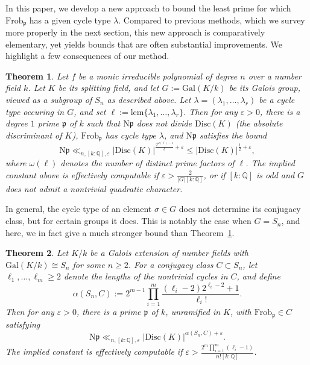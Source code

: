 \documentclass[12pt]{amsart}
\newtheorem{theorem}{Theorem}
\theoremstyle{definition} \newtheorem{definition}[theorem]{Definition}
\theoremstyle{example} \newtheorem{example}[theorem]{Example}
\theoremstyle{remark} \newtheorem{remark}{Remark}[theorem]
\numberwithin{equation}{section}
\numberwithin{theorem}{section}
\renewcommand{\epsilon}{\varepsilon}
\renewcommand{\leq}{\leqslant}
\renewcommand{\geq}{\geqslant}
\newcommand{\N}{\mathrm{N}} %
\begin{document}
	In this paper, we develop a new approach to bound the least prime for which $\mathrm{Frob}_\mathfrak{p}$ has a given cycle type $\lambda$.  Compared to previous methods, which we survey more properly in the next section, this new approach is comparatively elementary, yet yields bounds that are often substantial improvements.  We highlight a few consequences of our method.
	
	
	\begin{theorem}\label{thm:least-prime-general}
		Let $f$ be a monic irreducible polynomial of degree $n$ over a number field $k$. Let $K$ be its splitting field, and let $G := \mathrm{Gal}(K/k)$ be its Galois group, viewed as a subgroup of $S_n$ as described above.  Let $\lambda = (\lambda_1,\dots,\lambda_r)$ be a cycle type occuring in $G$, and set $\ell := \mathrm{lcm}\{\lambda_1,\dots,\lambda_r\}$.  Then for any $\epsilon>0$, there is a degree $1$ prime $\mathfrak{p}$ of $k$ such that $\N\mathfrak{p}$ does not divide $\mathrm{Disc}(K)$ (the absolute discriminant of $K$),  $\mathrm{Frob}_\mathfrak{p}$ has cycle type $\lambda$, and $\N\mathfrak{p}$ satisfies the bound
			\[
				\N\mathfrak{p}
					\ll_{n,[k:\mathbb{Q}],\epsilon} |\mathrm{Disc}(K)|^{\frac{2^{\omega(\ell)-1}}{\ell} + \epsilon}
					\leq |\mathrm{Disc}(K)|^{\frac{1}{2} + \epsilon},
			\]
		where $\omega(\ell)$ denotes the number of distinct prime factors of $\ell$.  The implied constant above is effectively computable if $\epsilon > \frac{2}{|G|[k:\mathbb{Q}]}$, or if $[k:\mathbb{Q}]$ is odd and $G$ does not admit a nontrivial quadratic character.
	\end{theorem}
	
	In general, the cycle type of an element $\sigma \in G$ does not determine its conjugacy class, but for certain groups it does.  This is notably the case when $G=S_n$, and here, we in fact give a much stronger bound than Theorem~\ref{thm:least-prime-general}.
	
	\begin{theorem} \label{thm:Sn-cycle-intro}
		Let $K/k$ be a Galois extension of number fields with $\mathrm{Gal}(K/k) \cong S_n$ for some $n \geq 2$.  For a conjugacy class $C \subset S_n$, let $\ell_1,\dots,\ell_m \geq 2$ denote the lengths of the nontrivial cycles in  $C$, and define
			\[
				\alpha(S_n,C)
					:= 2^{m-1} \prod_{i=1}^m \frac{(\ell_i-2)2^{\ell_i-2}+1}{\ell_i!}.
			\]
		Then for any $\epsilon>0$, there is a prime $\mathfrak{p}$ of $k$, unramified in $K$, with $\mathrm{Frob}_\mathfrak{p} \in C$ satisfying
			\[
				\N\mathfrak{p}
					\ll_{n,[k:\mathbb{Q}],\epsilon} |\mathrm{Disc}(K)|^{\alpha(S_n,C)+\epsilon}.
			\]
		The implied constant is effectively computable if $\epsilon > \frac{2^m \prod_{i=1}^m (\ell_i-1)}{n! [k:\mathbb{Q}]}$.
	\end{theorem}
	
\end{document}

